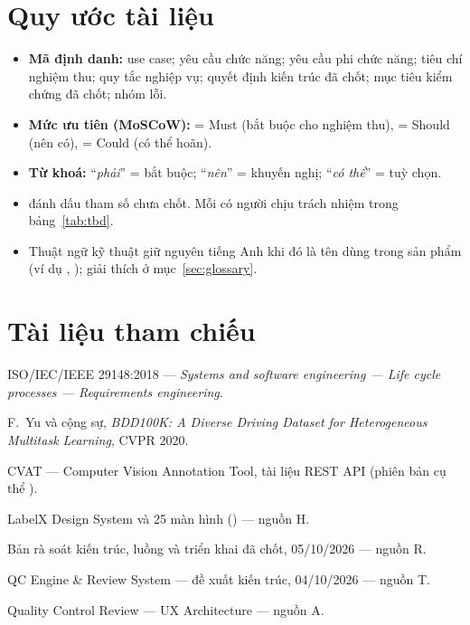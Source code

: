 \section{Quy ước tài liệu}
\begin{itemize}
  \item \textbf{Mã định danh:}  use case;  yêu cầu
        chức năng;  yêu cầu phi chức năng;  tiêu chí
        nghiệm thu;  quy tắc nghiệp vụ;  quyết định kiến
        trúc đã chốt;  mục tiêu kiểm chứng đã chốt;  nhóm lỗi.
  \item \textbf{Mức ưu tiên (MoSCoW):} \must{} = Must (bắt buộc cho nghiệm thu),
        \should{} = Should (nên có), \could{} = Could (có thể hoãn).
  \item \textbf{Từ khoá:} “\emph{phải}” = bắt buộc; “\emph{nên}” = khuyến nghị;
        “\emph{có thể}” = tuỳ chọn.
  \item \TBD{} đánh dấu tham số chưa chốt. Mỗi \TBD{} có người chịu trách
        nhiệm trong bảng~\ref{tab:tbd}.
  \item Thuật ngữ kỹ thuật giữ nguyên tiếng Anh khi đó là tên dùng trong sản
        phẩm (ví dụ , ); giải thích ở mục~\ref{sec:glossary}.
\end{itemize}

\section{Tài liệu tham chiếu}
\begin{enumerate}[label={[\arabic*]}, leftmargin=2.2em]
  \item ISO/IEC/IEEE 29148:2018 — \emph{Systems and software engineering — Life cycle processes — Requirements engineering}.
  \item F.~Yu và cộng sự, \emph{BDD100K: A Diverse Driving Dataset for Heterogeneous Multitask Learning}, CVPR 2020.
  \item CVAT — Computer Vision Annotation Tool, tài liệu REST API (phiên bản cụ thể \TBD[-01]).
  \item LabelX Design System và 25 màn hình () — nguồn H.
  \item Bản rà soát kiến trúc, luồng và triển khai đã chốt, 05/10/2026 — nguồn R.
  \item QC Engine \& Review System — đề xuất kiến trúc, 04/10/2026 — nguồn T.
  \item Quality Control Review — UX Architecture — nguồn A.
\end{enumerate}


